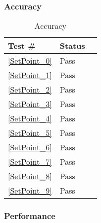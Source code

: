 \documentclass[12pt]{article}
\newcounter{TestCounter}
\begin{document}
	\subsubsection{Accuracy}
		\begin{table}[H]
		\centering
		\caption{Accuracy}\label{SetPoint_acc}
		\begin{tabular}{lll}
		\toprule
		\bf Test \# & Status \\\midrule
		\ref{SetPoint_0} & Pass\\
		\ref{SetPoint_1} & Pass\\
		\ref{SetPoint_2} & Pass\\
		\ref{SetPoint_3} & Pass\\
		\ref{SetPoint_4} & Pass\\
		\ref{SetPoint_5} & Pass\\
		\ref{SetPoint_6} & Pass\\
		\ref{SetPoint_7} & Pass\\
		\ref{SetPoint_8} & Pass\\
		\ref{SetPoint_9} & Pass\\
		\bottomrule
		\end{tabular}
		\end{table}
	\subsubsection{Performance}

\end{document}
